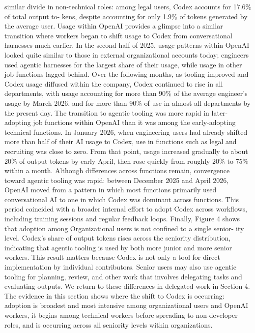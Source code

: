 similar divide in non-technical roles: among legal users, Codex accounts for 17.6\% of total output to-
kens, despite accounting for only 1.9\% of tokens generated by the average user.
Usage within OpenAI provides a glimpse into a similar transition where workers began to shift
usage to Codex from conversational harnesses much earlier. In the second half of 2025, usage patterns
within OpenAI looked quite similar to those in external organizational accounts today; engineers used
agentic harnesses for the largest share of their usage, while usage in other job functions lagged behind.
Over the following months, as tooling improved and Codex usage diffused within the company, Codex
continued to rise in all departments, with usage accounting for more than 90\% of the average engineer’s
usage by March 2026, and for more than 90\% of use in almost all departments by the present day.
The transition to agentic tooling was more rapid in later-adopting job functions within OpenAI
than it was among the early-adopting technical functions. In January 2026, when engineering users had
already shifted more than half of their AI usage to Codex, use in functions such as legal and recruiting
was close to zero. From that point, usage increased gradually to about 20\% of output tokens by early
April, then rose quickly from roughly 20\% to 75\% within a month. Although differences across functions
remain, convergence toward agentic tooling was rapid: between December 2025 and April 2026, OpenAI
moved from a pattern in which most functions primarily used conversational AI to one in which Codex
was dominant across functions. This period coincided with a broader internal effort to adopt Codex
across workflows, including training sessions and regular feedback loops.
Finally, Figure 4 shows that adoption among Organizational users is not confined to a single senior-
ity level. Codex’s share of output tokens rises across the seniority distribution, indicating that agentic
tooling is used by both more junior and more senior workers. This result matters because Codex is
not only a tool for direct implementation by individual contributors. Senior users may also use agentic
tooling for planning, review, and other work that involves delegating tasks and evaluating outputs. We
return to these differences in delegated work in Section 4.
The evidence in this section shows where the shift to Codex is occurring: adoption is broadest and
most intensive among organizational users and OpenAI workers, it begins among technical workers
before spreading to non-developer roles, and is occurring across all seniority levels within organizations.
